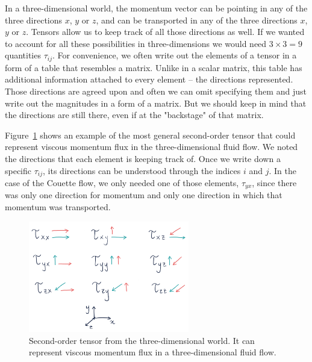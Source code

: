 \documentclass[10pt,twocolumn]{article}
\begin{document}
In a three-dimensional world, the momentum vector can be pointing in any of the three directions $x$, $y$ or $z$, and can be transported in any of the three directions $x$, $y$ or $z$. Tensors allow us to keep track of all those directions as well. If we wanted to account for all these possibilities in three-dimensions we would need $3 \times 3 = 9$ quantities $\tau_{ij}$. For convenience, we often write out the elements of a tensor in a form of a table that resembles a matrix. Unlike in a scalar matrix, this table has additional information attached to every element -- the directions represented. Those directions are agreed upon and often we can omit specifying them and just write out the magnitudes in a form of a matrix. But we should keep in mind that the directions are still there, even if at the "backstage" of that matrix.

Figure~\ref{fig:tensor-in-matrix-form} shows an example of the most general second-order tensor that could represent viscous momentum flux in the three-dimensional fluid flow. We noted the directions that each element is keeping track of. Once we write down a specific $\tau_{ij}$, its directions can be understood through the indices $i$ and $j$. In the case of the Couette flow, we only needed one of those elements, $\tau_{yx}$, since there was only one direction for momentum and only one direction in which that momentum was transported.

\begin{figure}[H]
\centering\includegraphics[width=7cm]{tensor-in-matrix-form.png}
\caption{Second-order tensor from the three-dimensional world. It can represent viscous momentum flux in a three-dimensional fluid flow.}
\label{fig:tensor-in-matrix-form}
\end{figure}


\end{document}
